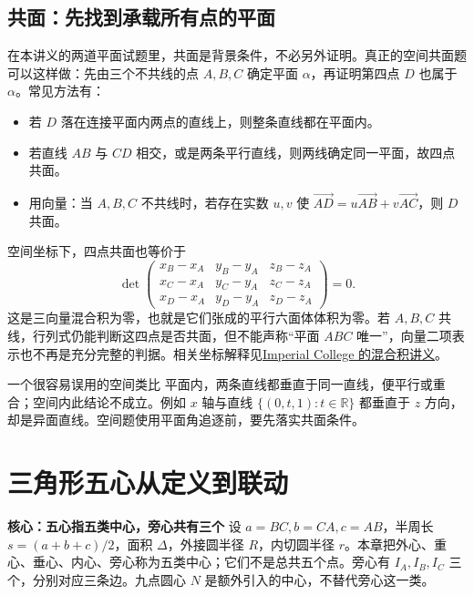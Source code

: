 \documentclass[lang=cn,12pt,fontset=none,a4paper,openany]{beautybook}
\newcommand{\level}[1]{\par\smallskip\noindent\textcolor{coverfgcolor}{\textbf{#1}}\quad}
\begin{document}
\section{共面：先找到承载所有点的平面}
在本讲义的两道平面试题里，共面是背景条件，不必另外证明。真正的空间共面题可以这样做：先由三个不共线的点 $A,B,C$ 确定平面 $\alpha$，再证明第四点 $D$ 也属于 $\alpha$。常见方法有：
\begin{itemize}
\item 若 $D$ 落在连接平面内两点的直线上，则整条直线都在平面内。
\item 若直线 $AB$ 与 $CD$ 相交，或是两条平行直线，则两线确定同一平面，故四点共面。
\item 用向量：当 $A,B,C$ 不共线时，若存在实数 $u,v$ 使
$\overrightarrow{AD}=u\overrightarrow{AB}+v\overrightarrow{AC}$，则 $D$ 共面。
\end{itemize}
空间坐标下，四点共面也等价于
\[
 \det\begin{pmatrix}
 x_B-x_A&y_B-y_A&z_B-z_A\\
 x_C-x_A&y_C-y_A&z_C-z_A\\
 x_D-x_A&y_D-y_A&z_D-z_A
 \end{pmatrix}=0.
\]
这是三向量混合积为零，也就是它们张成的平行六面体体积为零。若 $A,B,C$ 共线，行列式仍能判断这四点是否共面，但不能声称“平面 $ABC$ 唯一”，向量二项表示也不再是充分完整的判据。相关坐标解释见\href{https://metric.ma.ic.ac.uk/metric_public/vectors/vector_coordinate_geometry/scalar_triple_product.html}{Imperial College 的混合积讲义}。

\begin{keybox}{一个很容易误用的空间类比}
平面内，两条直线都垂直于同一直线，便平行或重合；空间内此结论不成立。例如 $x$ 轴与直线 $\{(0,t,1):t\in\mathbb R\}$ 都垂直于 $z$ 方向，却是异面直线。空间题使用平面角追逐前，要先落实共面条件。
\end{keybox}

\chapter{三角形五心从定义到联动}
\level{核心：五心指五类中心，旁心共有三个}
设 $a=BC,b=CA,c=AB$，半周长 $s=(a+b+c)/2$，面积 $\Delta$，外接圆半径 $R$，内切圆半径 $r$。本章把外心、重心、垂心、内心、旁心称为五类中心；它们不是总共五个点。旁心有 $I_A,I_B,I_C$ 三个，分别对应三条边。九点圆心 $N$ 是额外引入的中心，不替代旁心这一类。
\end{document}
